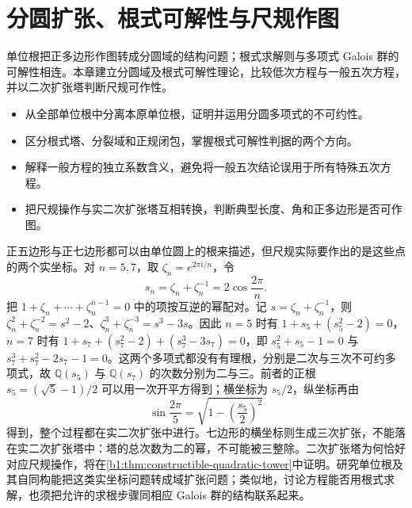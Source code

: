 
\chapter[分圆扩张、根式可解性与尺规作图]{分圆扩张、根式可解性与尺规作图}
\label{b1:ch:21}

\begin{chapterabstract}
	单位根把正多边形作图转成分圆域的结构问题；根式求解则与多项式 Galois 群的可解性相连。本章建立分圆域及根式可解性理论，比较低次方程与一般五次方程，并以二次扩张塔判断尺规可作性。
\end{chapterabstract}

\begin{learninggoals}
	\begin{itemize}
		\item 从全部单位根中分离本原单位根，证明并运用分圆多项式的不可约性。
		\item 区分根式塔、分裂域和正规闭包，掌握根式可解性判据的两个方向。
		\item 解释一般方程的独立系数含义，避免将一般五次结论误用于所有特殊五次方程。
		\item 把尺规操作与实二次扩张塔互相转换，判断典型长度、角和正多边形是否可作图。
	\end{itemize}
\end{learninggoals}

正五边形与正七边形都可以由单位圆上的根来描述，但尺规实际要作出的是这些点的两个实坐标。对 \(n=5,7\)，取 \(\zeta_n=e^{2\pi i/n}\)，令
\[
	s_n=\zeta_n+\zeta_n^{-1}=2\cos\frac{2\pi}{n}.
\]
把 \(1+\zeta_n+\cdots+\zeta_n^{n-1}=0\) 中的项按互逆的幂配对。记 \(s=\zeta_n+\zeta_n^{-1}\)，则 \(\zeta_n^2+\zeta_n^{-2}=s^2-2\)、\(\zeta_n^3+\zeta_n^{-3}=s^3-3s\)。因此 \(n=5\) 时有 \(1+s_5+(s_5^2-2)=0\)，\(n=7\) 时有 \(1+s_7+(s_7^2-2)+(s_7^3-3s_7)=0\)，即 \(s_5^2+s_5-1=0\) 与 \(s_7^3+s_7^2-2s_7-1=0\)。这两个多项式都没有有理根，分别是二次与三次不可约多项式，故 \(\mathbb Q(s_5)\) 与 \(\mathbb Q(s_7)\) 的次数分别为二与三。前者的正根 \(s_5=(\sqrt5-1)/2\) 可以用一次开平方得到；横坐标为 \(s_5/2\)，纵坐标再由
\[
	\sin\frac{2\pi}{5}=\sqrt{1-\left(\frac{s_5}{2}\right)^2}
\]
得到，整个过程都在实二次扩张中进行。七边形的横坐标则生成三次扩张，不能落在实二次扩张塔中：塔的总次数为二的幂，不可能被三整除。二次扩张塔为何恰好对应尺规操作，将在\cref{b1:thm:constructible-quadratic-tower}中证明。研究单位根及其自同构能把这类实坐标问题转成域扩张问题；类似地，讨论方程能否用根式求解，也须把允许的求根步骤同相应 Galois 群的结构联系起来。

